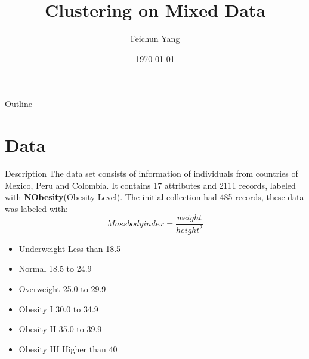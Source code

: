 \documentclass[11pt]{beamer}
\author{Feichun Yang}
\title{Clustering on Mixed Data}
\institute[]{SYRACUSE UNIVERSITY}
\date{\today}
\begin{document}
\begin{frame}
\titlepage
\end{frame}

\begin{frame}{Outline}
\tableofcontents 
\end{frame}

\section{Data}
\begin{frame}{Description}
The data set\cite{palechor2019dataset} consists of information of individuals from countries of Mexico, Peru and Colombia. It contains 17 attributes and 2111 records, labeled with \textbf{NObesity}(Obesity Level). 
The initial collection had 485 records, these data was labeled with:
$$Mass body index = \frac{weight}{height^2}$$
\begin{itemize}
    \item Underweight Less than 18.5
    \item Normal 18.5 to 24.9
    \item Overweight 25.0 to 29.9
    \item Obesity I 30.0 to 34.9
    \item Obesity II 35.0 to 39.9
    \item Obesity III Higher than 40
\end{itemize}
\end{frame} 
\end{document}
